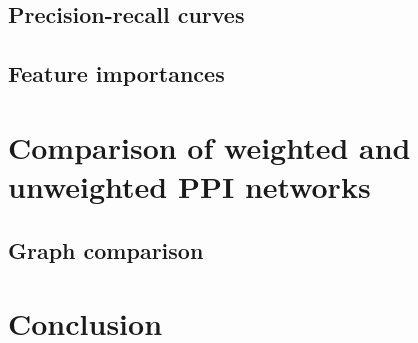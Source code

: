 


\subsection{Precision-recall curves}




\subsection{Feature importances}




\section{Comparison of weighted and unweighted PPI networks}




\subsection{Graph comparison}


\section*{Conclusion}


